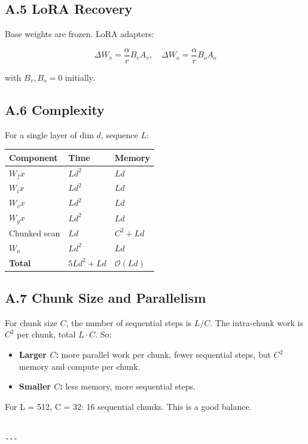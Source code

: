 \subsection{A.5 LoRA Recovery}

Base weights are frozen. LoRA adapters:

\[
\Delta W_v = \frac{\alpha}{r} B_v A_v, \quad
\Delta W_o = \frac{\alpha}{r} B_o A_o
\tag{A.10}
\]

with $B_v, B_o = 0$ initially.

\subsection{A.6 Complexity}

For a single layer of dim $d$, sequence $L$:

\begin{table}[H]
\centering
\small
\begin{tabular}{lll}
\toprule
\textbf{Component} & \textbf{Time} & \textbf{Memory} \\
\midrule
$W_f x$ & $L d^2$ & $L d$ \\
$W_i x$ & $L d^2$ & $L d$ \\
$W_v x$ & $L d^2$ & $L d$ \\
$W_g x$ & $L d^2$ & $L d$ \\
Chunked scan & $L d$ & $C^2 + L d$ \\
$W_o$ & $L d^2$ & $L d$ \\
\textbf{Total} & $5 L d^2 + L d$ & $\mathcal{O}(L d)$ \\
\bottomrule
\end{tabular}
\end{table}

\subsection{A.7 Chunk Size and Parallelism}

For chunk size $C$, the number of sequential steps is $L / C$. The 
intra-chunk work is $C^2$ per chunk, total $L \cdot C$. So:

\begin{itemize}
\item \textbf{Larger $C$:} more parallel work per chunk, fewer sequential steps, but
  $C^2$ memory and compute per chunk.
\item \textbf{Smaller $C$:} less memory, more sequential steps.

\end{itemize}
For L = 512, C = 32: 16 sequential chunks. This is a good balance.
\begin{lstlisting}

---
\end{lstlisting}

